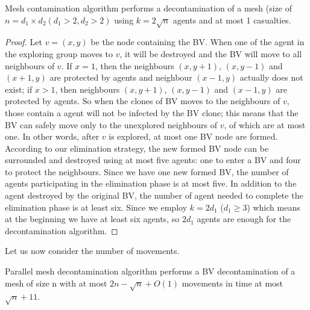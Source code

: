 \begin{theorem}
Mesh contamination algorithm performs a decontamination of a mesh (size of $n=d_1\times d_2(d_1>2,d_2>2)$ using $k=2\sqrt{n}$ agents and at most 1 casualties.
\end{theorem}
\begin{proof}
Let $v=(x, y)$ be the node containing the BV. When one of the agent in the exploring group moves to $v$, it will be destroyed and the BV will move to all neighbours of $v$. If $x=1$, then the neighbours $(x, y+1)$, $(x, y-1)$ and $(x+1, y)$ are protected by agents and neighbour $(x-1, y)$ actually does not exist; if $x>1$, then neighbours $(x, y+1)$, $(x, y-1)$ and $(x-1, y)$ are protected by agents. So when the clones of BV moves to the neighbours of $v$, those contain a agent will not be infected by the BV clone; this means that the BV can safely move only to the unexplored neighbours of $v$, of which are at most one. In other words, after $v$ is explored, at most one BV node are formed. According to our elimination strategy, the new formed BV node can be surrounded and destroyed using at most five agents: one to enter a BV and four to protect the neighbours. Since we have one new formed BV, the number of agents participating in the elimination phase is at most five. In addition to the agent destroyed by the original BV, the number of agent needed to complete the elimination phase is at least six. Since we employ $k=2d_1$ ($d_1\geq 3$) which means at the beginning we have at least six agents, so $2d_1$ agents are enough for the decontamination algorithm.
\end{proof}
Let us now consider the number of movements.
\begin{theorem}
Parallel mesh decontamination algorithm performs a BV decontamination of a mesh of size n with at most $2n-\sqrt{n}+O(1)$ movements in time at most $\sqrt{n}+11$.
\end{theorem}
